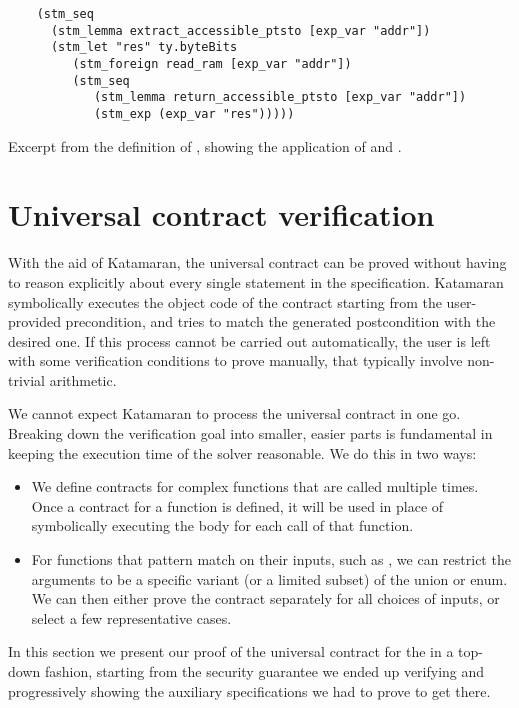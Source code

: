 \begin{listing}[p]
  \begin{verbatim}
    (stm_seq
      (stm_lemma extract_accessible_ptsto [exp_var "addr"])
      (stm_let "res" ty.byteBits
         (stm_foreign read_ram [exp_var "addr"])
         (stm_seq
            (stm_lemma return_accessible_ptsto [exp_var "addr"])
            (stm_exp (exp_var "res")))))
  \end{verbatim}
  \caption{Excerpt from the \usail definition of , showing the application of  and .}
  \label{lst:accessible-lemma-use}
\end{listing}

\section{Universal contract verification}
\label{sec:uc-verification}


With the aid of Katamaran, the universal contract can be proved without having to reason explicitly about every single statement in the \usail specification. Katamaran symbolically executes the object code of the contract starting from the user-provided precondition, and tries to match the generated postcondition with the desired one. If this process cannot be carried out automatically, the user is left with some verification conditions to prove manually, that typically involve non-trivial arithmetic.

We cannot expect Katamaran to process the universal contract in one go. Breaking down the verification goal into smaller, easier parts is fundamental in keeping the execution time of the solver reasonable. We do this in two ways:
\begin{itemize}
\item We define contracts for complex functions that are called multiple times. Once a contract for a function is defined, it will be used in place of symbolically executing the body for each call of that function.
\item For functions that pattern match on their inputs, such as , we can restrict the arguments to be a specific variant (or a limited subset) of the union or enum. We can then either prove the contract separately for all choices of inputs, or select a few representative cases.
\end{itemize}

In this section we present our proof of the universal contract for the \msp in a top-down fashion, starting from the security guarantee we ended up verifying and progressively showing the auxiliary specifications we had to prove to get there.

